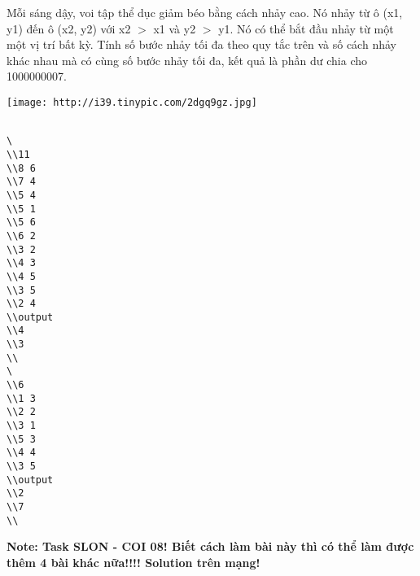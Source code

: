 Mỗi sáng dậy, voi tập thể dục giảm béo bằng cách nhảy cao. Nó nhảy từ ô (x1, y1) đến ô (x2, y2) với x2 $>$ x1 và y2 $>$ y1. Nó có thể bắt đầu nhảy từ một một vị trí bất kỳ. Tính số bước nhảy tối đa theo quy tắc trên và số cách nhảy khác nhau mà có cùng số bước nhảy tối đa, kết quả là phần dư chia cho 1000000007.  

\href{http://tinypic.com}{}


\texttt{[image: http://i39.tinypic.com/2dgq9gz.jpg]}
\begin{verbatim}

\ 
\\11 
\\8 6 
\\7 4 
\\5 4 
\\5 1 
\\5 6 
\\6 2 
\\3 2 
\\4 3 
\\4 5 
\\3 5 
\\2 4 
\\output 
\\4 
\\3 
\\
\ 
\\6 
\\1 3 
\\2 2 
\\3 1 
\\5 3 
\\4 4 
\\3 5 
\\output 
\\2 
\\7 
\\\end{verbatim}

\textbf{    Note: Task SLON - COI 08! Biết cách làm bài này thì có thể làm được thêm 4 bài khác nữa!!!! Solution trên mạng!   }
